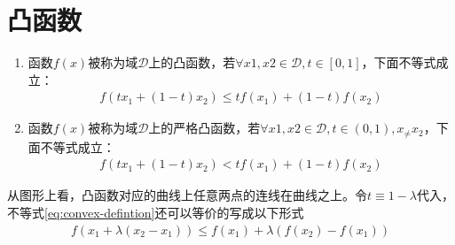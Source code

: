 \section{凸函数}
\label{sec:convex-functions}

\begin{definition}[凸函数]

  \begin{enumerate}
  \item 函数$f(x)$被称为域$\mathcal{D}$上的凸函数，若$\forall x1,x2\in\mathcal{D}, t\in[0,1]$，下面不等式成立：
    \begin{align}\label{eq:convex-defintion}
      f\left(tx_1+(1-t)x_2\right)\le tf(x_1) + (1-t)f(x_2)
    \end{align}
  \item 函数$f(x)$被称为域$\mathcal{D}$上的严格凸函数，若$\forall x1,x2\in\mathcal{D}, t\in(0,1),x_\ne x_2$，下面不等式成立：
    \begin{align}
      f\left(tx_1+(1-t)x_2\right)< tf(x_1) + (1-t)f(x_2)
    \end{align}
  \end{enumerate}
\end{definition}

从图形上看，凸函数对应的曲线上任意两点的连线在曲线之上。令$t\equiv 1-\lambda$代入，不等式\ref{eq:convex-defintion}还可以等价的写成以下形式
\begin{align*}
  f\left(x_1+\lambda(x_2-x_1)\right)\le f(x_1) + \lambda \left(f(x_2)-f(x_1)\right)
\end{align*}


